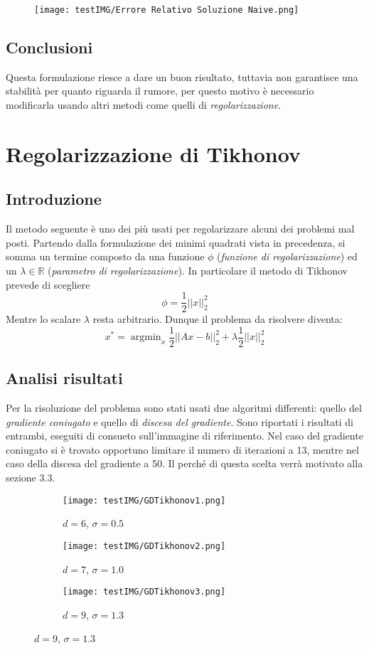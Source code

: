 \documentclass{article}
\DeclareMathOperator*{\argmin}{argmin}
\begin{document}
\begin{figure}
    \centering
    \texttt{[image: testIMG/Errore Relativo Soluzione Naive.png]}
\end{figure}

\newpage

\subsection{Conclusioni}
Questa formulazione riesce a dare un buon risultato, tuttavia non garantisce una stabilità per quanto riguarda il rumore, per questo motivo è necessario modificarla usando altri metodi come quelli di \textit{ regolarizzazione}.

\section{Regolarizzazione di Tikhonov}
\subsection{Introduzione}
Il metodo seguente è uno dei più usati per regolarizzare alcuni dei problemi mal posti. 
Partendo dalla formulazione dei minimi quadrati vista in precedenza, si somma un termine composto da una funzione $\phi$ (\textit{funzione di regolarizzazione}) ed un $\lambda \in \mathbb{R}$ (\textit{parametro di regolarizzazione}). In particolare il metodo di Tikhonov prevede di scegliere $$\phi = \frac{1}{2}||x||^2_2$$
Mentre lo scalare $\lambda$ resta arbitrario.
Dunque il problema da risolvere diventa:
$$ x^* = \argmin_x \frac{1}{2}||Ax - b||_2^2 + \lambda \frac{1}{2}||x||^2_2 $$

\newpage
\subsection{Analisi risultati}
Per la risoluzione del problema sono stati usati due algoritmi differenti: quello del \textit{gradiente coniugato} e quello di \textit{discesa del gradiente}. Sono riportati i risultati di entrambi, eseguiti di consueto sull'immagine di riferimento. 
Nel caso del gradiente coniugato si è trovato opportuno limitare il numero di iterazioni a 13, mentre nel caso della discesa del gradiente a 50. Il perché di questa scelta verrà motivato alla sezione 3.3.


\begin{figure}[h]
\begin{subfigure}{0.36\textwidth}
    \texttt{[image: testIMG/GDTikhonov1.png]}
    \caption{$d=6$, $\sigma=0.5$}
    \label{fig:first}
\end{subfigure}%
    \hfill
\begin{subfigure}{0.3\textwidth}
    \texttt{[image: testIMG/GDTikhonov2.png]}
        \caption{$d=7$, $\sigma=1.0$}
    \label{fig:second}
\end{subfigure}%
\hfill
\begin{subfigure}{0.3\textwidth}
    \texttt{[image: testIMG/GDTikhonov3.png]}
        \caption{$d=9$, $\sigma=1.3$}
    \label{fig:third}
\end{subfigure}
\label{fig:figures}
\end{figure}
\end{document}
